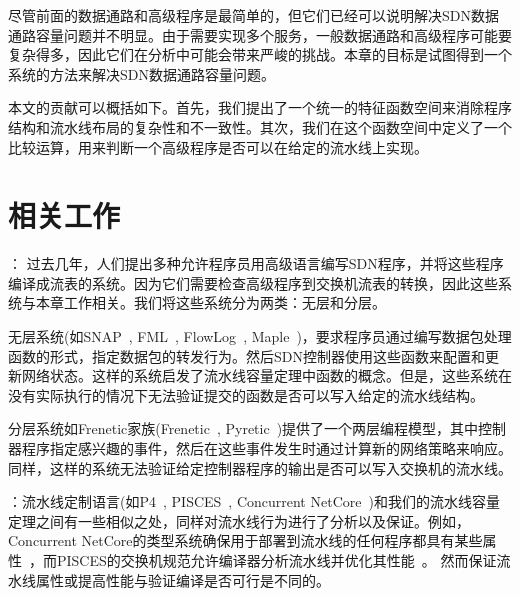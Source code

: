 尽管前面的数据通路和高级程序是最简单的，但它们已经可以说明解决SDN数据通路容量问题并不明显。由于需要实现多个服务，一般数据通路和高级程序可能要复杂得多，因此它们在分析中可能会带来严峻的挑战。本章的目标是试图得到一个系统的方法来解决SDN数据通路容量问题。

本文的贡献可以概括如下。首先，我们提出了一个统一的特征函数空间来消除程序结构和流水线布局的复杂性和不一致性。其次，我们在这个函数空间中定义了一个比较运算，用来判断一个高级程序是否可以在给定的流水线上实现。



\section{相关工作}\label{sec:related-work}
： 过去几年，人们提出多种允许程序员用高级语言编写SDN程序，并将这些程序编译成流表的系统。因为它们需要检查高级程序到交换机流表的转换，因此这些系统与本章工作相关。我们将这些系统分为两类：无层和分层。

无层系统(如SNAP~\cite{arashloo2016snap}, FML~\cite{hinrichs2009practical}, FlowLog~\cite{flowlog},  Maple~\cite{maple})，要求程序员通过编写数据包处理函数的形式，指定数据包的转发行为。然后SDN控制器使用这些函数来配置和更新网络状态。这样的系统启发了流水线容量定理中函数的概念。但是，这些系统在没有实际执行的情况下无法验证提交的函数是否可以写入给定的流水线结构。

分层系统如Frenetic家族(Frenetic~\cite{foster2011frenetic}, Pyretic~\cite{reich2013modular})提供了一个两层编程模型，其中控制器程序指定感兴趣的事件，然后在这些事件发生时通过计算新的网络策略来响应。同样，这样的系统无法验证给定控制器程序的输出是否可以写入交换机的流水线。

：流水线定制语言(如P4~\cite{P4}, PISCES~\cite{shahbaz2016pisces}, Concurrent NetCore~\cite{schlesinger2014concurrent})和我们的流水线容量定理之间有一些相似之处，同样对流水线行为进行了分析以及保证。例如，Concurrent NetCore的类型系统确保用于部署到流水线的任何程序都具有某些属性~\cite{schlesinger2014concurrent}，而PISCES的交换机规范允许编译器分析流水线并优化其性能~\cite{shahbaz2016pisces}。
然而保证流水线属性或提高性能与验证编译是否可行是不同的。



